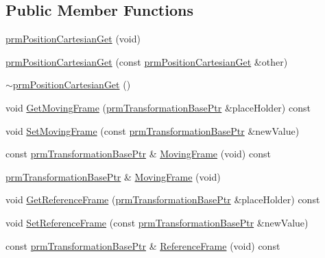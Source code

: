 \subsection*{Public Member Functions}
\begin{DoxyCompactItemize}
\item 
\hyperlink{classprm_position_cartesian_get_ac0941fa7c4cc4583adf6b1cecb7d92f0}{prm\-Position\-Cartesian\-Get} (void)
\item 
\hyperlink{classprm_position_cartesian_get_a7e8b5143b6cbd2883e68856474b5bc54}{prm\-Position\-Cartesian\-Get} (const \hyperlink{classprm_position_cartesian_get}{prm\-Position\-Cartesian\-Get} \&other)
\item 
\hyperlink{classprm_position_cartesian_get_acb3656d5a4781e86d21c857e740d0f75}{$\sim$prm\-Position\-Cartesian\-Get} ()
\item 
void \hyperlink{classprm_position_cartesian_get_a65c1f3544dbdd28ccca698f99561d928}{Get\-Moving\-Frame} (\hyperlink{prm_transformation_base_8h_a881a6a7d2191474974cdf36d79e1df08}{prm\-Transformation\-Base\-Ptr} \&place\-Holder) const 
\item 
void \hyperlink{classprm_position_cartesian_get_aa6f87f3c033e67fcf149388c515e38e3}{Set\-Moving\-Frame} (const \hyperlink{prm_transformation_base_8h_a881a6a7d2191474974cdf36d79e1df08}{prm\-Transformation\-Base\-Ptr} \&new\-Value)
\item 
const \hyperlink{prm_transformation_base_8h_a881a6a7d2191474974cdf36d79e1df08}{prm\-Transformation\-Base\-Ptr} \& \hyperlink{classprm_position_cartesian_get_a7e55c0fe6c7327cd75a5d40e36550297}{Moving\-Frame} (void) const 
\item 
\hyperlink{prm_transformation_base_8h_a881a6a7d2191474974cdf36d79e1df08}{prm\-Transformation\-Base\-Ptr} \& \hyperlink{classprm_position_cartesian_get_a5b5bb24454759a6c00e62f18541a0eec}{Moving\-Frame} (void)
\item 
void \hyperlink{classprm_position_cartesian_get_a367e1e61f0b916e013dab02cc0d578d0}{Get\-Reference\-Frame} (\hyperlink{prm_transformation_base_8h_a881a6a7d2191474974cdf36d79e1df08}{prm\-Transformation\-Base\-Ptr} \&place\-Holder) const 
\item 
void \hyperlink{classprm_position_cartesian_get_aad5362bc55e2018c5cada3f00b07c9aa}{Set\-Reference\-Frame} (const \hyperlink{prm_transformation_base_8h_a881a6a7d2191474974cdf36d79e1df08}{prm\-Transformation\-Base\-Ptr} \&new\-Value)
\item 
const \hyperlink{prm_transformation_base_8h_a881a6a7d2191474974cdf36d79e1df08}{prm\-Transformation\-Base\-Ptr} \& \hyperlink{classprm_position_cartesian_get_af55a562074f9675c2a6aa74a2969420f}{Reference\-Frame} (void) const 

\end{DoxyCompactItemize}
